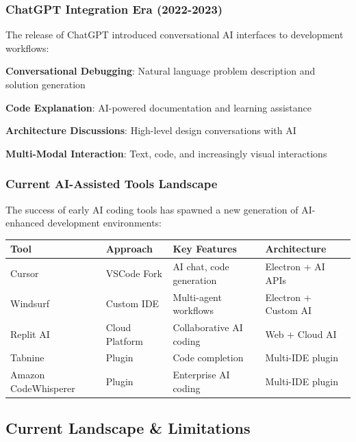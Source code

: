 \subsubsection{ChatGPT Integration Era (2022-2023)}

The release of ChatGPT introduced conversational AI interfaces to development workflows:

\begin{expandedlist}
    \item \textbf{Conversational Debugging}: Natural language problem description and solution generation
    \item \textbf{Code Explanation}: AI-powered documentation and learning assistance
    \item \textbf{Architecture Discussions}: High-level design conversations with AI
    \item \textbf{Multi-Modal Interaction}: Text, code, and increasingly visual interactions
\end{expandedlist}

\subsubsection{Current AI-Assisted Tools Landscape}

The success of early AI coding tools has spawned a new generation of AI-enhanced development environments:

\begin{center}
\begin{tabular}{@{}llll@{}}
\toprule
\textbf{Tool} & \textbf{Approach} & \textbf{Key Features} & \textbf{Architecture} \\
\midrule
Cursor & VSCode Fork & AI chat, code generation & Electron + AI APIs \\
Windsurf & Custom IDE & Multi-agent workflows & Electron + Custom AI \\
Replit AI & Cloud Platform & Collaborative AI coding & Web + Cloud AI \\
Tabnine & Plugin & Code completion & Multi-IDE plugin \\
Amazon CodeWhisperer & Plugin & Enterprise AI coding & Multi-IDE plugin \\
\bottomrule
\end{tabular}
\end{center}

\subsection{Current Landscape \& Limitations}
\label{subsec:current-limitations}

